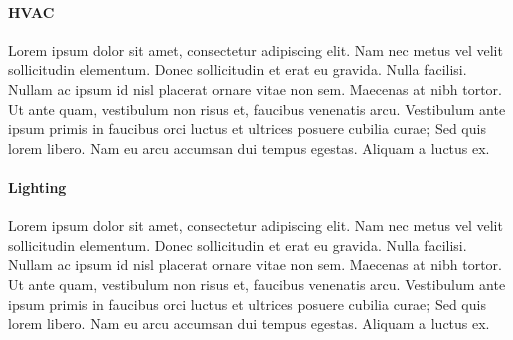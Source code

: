 \paragraph{HVAC} Lorem ipsum dolor sit amet, consectetur adipiscing elit. Nam nec metus vel velit sollicitudin elementum. Donec sollicitudin et erat eu gravida. Nulla facilisi. Nullam ac ipsum id nisl placerat ornare vitae non sem. Maecenas at nibh tortor. Ut ante quam, vestibulum non risus et, faucibus venenatis arcu. Vestibulum ante ipsum primis in faucibus orci luctus et ultrices posuere cubilia curae; Sed quis lorem libero. Nam eu arcu accumsan dui tempus egestas. Aliquam a luctus ex.

\paragraph{Lighting} Lorem ipsum dolor sit amet, consectetur adipiscing elit. Nam nec metus vel velit sollicitudin elementum. Donec sollicitudin et erat eu gravida. Nulla facilisi. Nullam ac ipsum id nisl placerat ornare vitae non sem. Maecenas at nibh tortor. Ut ante quam, vestibulum non risus et, faucibus venenatis arcu. Vestibulum ante ipsum primis in faucibus orci luctus et ultrices posuere cubilia curae; Sed quis lorem libero. Nam eu arcu accumsan dui tempus egestas. Aliquam a luctus ex.